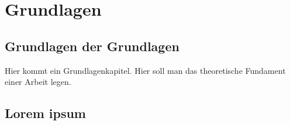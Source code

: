 \chapter{Grundlagen}

\section{Grundlagen der Grundlagen}

Hier kommt ein Grundlagenkapitel.
Hier soll man das theoretische Fundament einer Arbeit legen.

\section{Lorem ipsum}

\lipsum